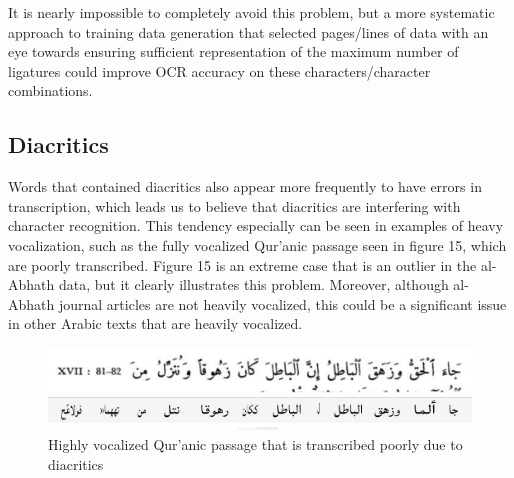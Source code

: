 It is nearly impossible to completely avoid this problem, but a more systematic
approach to training data generation that selected pages/lines of data with an
eye towards ensuring sufficient representation of the maximum number of
ligatures could improve OCR accuracy on these characters/character
combinations.

\subsection{Diacritics}

Words that contained diacritics also appear more frequently to have errors in
transcription, which leads us to believe that diacritics are interfering with
character recognition. This tendency especially can be seen in examples of
heavy vocalization, such as the fully vocalized Qur’anic passage seen in figure
15, which are poorly transcribed. Figure 15 is an extreme case that is an
outlier in the al-Abhath data, but it clearly illustrates this problem.
Moreover, although al-Abhath journal articles are not heavily vocalized, this
could be a significant issue in other Arabic texts that are heavily vocalized. 

\begin{figure}[h]
	\includegraphics[width=\linewidth]{images/image27.png}
	\caption{Highly vocalized Qur’anic passage that is transcribed poorly due to diacritics}
  	\label{fig:fig15}
\end{figure}

